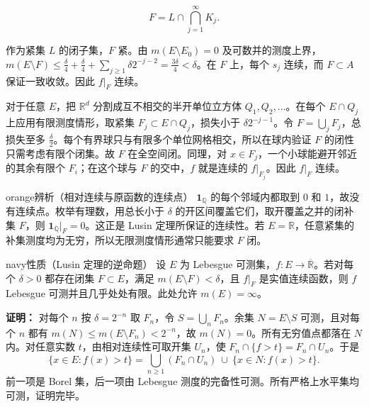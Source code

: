 \documentclass[11pt,a4paper]{article}
\begin{document}
\begin{equation*}
F=L\cap\bigcap_{j=1}^{\infty}K_j .
\tag{3.3.1}
\end{equation*}

作为紧集 \(L\) 的闭子集，\(F\) 紧。由 \(m(E\setminus E_0)=0\)
及可数并的测度上界，\(m(E\setminus F)\le\frac{\delta}{4}+\frac{\delta}{4}+\sum_{j\ge1}\delta 2^{-j-2}=\frac{3\delta}{4}<\delta\)。在
\(F\) 上，每个 \(s_j\) 连续，而 \(F\subset A\) 保证一致收敛。因此
\(f|_F\) 连续。

对于任意 \(E\)，把 \(\mathbb R^d\) 分割成互不相交的半开单位立方体
\(Q_1,Q_2,\ldots\)。在每个 \(E\cap Q_j\) 上应用有限测度情形，取紧集
\(F_j\subset E\cap Q_j\)，损失小于 \(\delta 2^{-j-1}\)。令
\(F=\bigcup_j F_j\)，总损失至多
\(\frac{\delta}{2}\)。每个有界球只与有限多个单位网格相交，所以在球内验证
\(F\) 的闭性只需考虑有限个闭集。故 \(F\) 在全空间闭。同理，对
\(x\in F_j\)，一个小球能避开邻近的其余有限个 \(F_i\)；在这个球与 \(F\)
的交中，\(f\) 就是连续的 \(f|_{F_j}\)。因此 \(f|_F\) 连续。

\begin{sboxenv}{orange}{辨析（相对连续与原函数的连续点）}
\(\mathbf1_{\mathbb Q}\) 的每个邻域内都取到 \(0\) 和
\(1\)，故没有连续点。枚举有理数，用总长小于 \(\delta\)
的开区间覆盖它们，取开覆盖之并的闭补集 \(F\)，则
\(\mathbf1_{\mathbb Q}|_F=0\)。这正是 Lusin 定理所保证的连续性。若
\(E=\mathbb R\)，任意紧集的补集测度均为无穷，所以无限测度情形通常只能要求
\(F\) 闭。

\end{sboxenv}

\begin{sboxenv}{navy}{性质（Lusin 定理的逆命题）}
设 \(E\) 为 Lebesgue 可测集，\(f:E\to\overline{\mathbb R}\)。若对每个
\(\delta>0\) 都存在闭集 \(F\subset E\)，满足
\(m(E\setminus F)<\delta\)，且 \(f|_F\) 是实值连续函数，则 \(f\)
Lebesgue 可测并且几乎处处有限。此处允许 \(m(E)=\infty\)。

\end{sboxenv}

\textbf{证明：} 对每个 \(n\) 按 \(\delta=2^{-n}\) 取 \(F_n\)，令
\(S=\bigcup_n F_n\)。余集 \(N=E\setminus S\) 可测，且对每个 \(n\) 都有
\(m(N)\le m(E\setminus F_n)<2^{-n}\)，故 \(m(N)=0\)。所有无穷值点都落在
\(N\) 内。对任意实数 \(t\)，由相对连续性可取开集 \(U_n\)，使
\(F_n\cap\{f>t\}=F_n\cap U_n\)。于是 \begin{equation*}
\{x\in E:f(x)>t\}=\bigcup_{n\ge1}(F_n\cap U_n)\ \cup\ \{x\in N:f(x)>t\}.
\end{equation*} 前一项是 Borel 集，后一项由 Lebesgue
测度的完备性可测。所有严格上水平集均可测，证明完毕。
\end{document}
